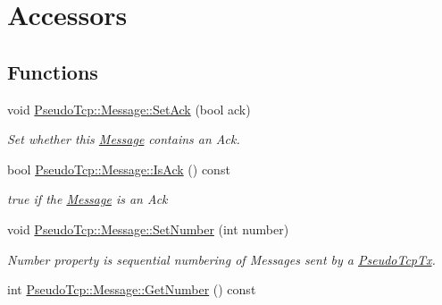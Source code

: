 \hypertarget{group__group1}{
\section{Accessors}
\label{group__group1}
}
\subsection*{Functions}
\begin{DoxyCompactItemize}
\item 
\hypertarget{group__group1_gaefd21c9f3d668b1e918bed1784afab84}{
void \hyperlink{group__group1_gaefd21c9f3d668b1e918bed1784afab84}{PseudoTcp::Message::SetAck} (bool ack)}
\label{group__group1_gaefd21c9f3d668b1e918bed1784afab84}

\begin{DoxyCompactList}\small\item\em Set whether this \hyperlink{classPseudoTcp_1_1Message}{Message} contains an Ack. \item\end{DoxyCompactList}\item 
\hypertarget{group__group1_ga6b3b9a3bccbaa08efa0ebfdbf6222581}{
bool \hyperlink{group__group1_ga6b3b9a3bccbaa08efa0ebfdbf6222581}{PseudoTcp::Message::IsAck} () const }
\label{group__group1_ga6b3b9a3bccbaa08efa0ebfdbf6222581}

\begin{DoxyCompactList}\small\item\em true if the \hyperlink{classPseudoTcp_1_1Message}{Message} is an Ack \item\end{DoxyCompactList}\item 
\hypertarget{group__group1_gafdf542899b221aee3bbce73738d9b809}{
void \hyperlink{group__group1_gafdf542899b221aee3bbce73738d9b809}{PseudoTcp::Message::SetNumber} (int number)}
\label{group__group1_gafdf542899b221aee3bbce73738d9b809}

\begin{DoxyCompactList}\small\item\em Number property is sequential numbering of Messages sent by a \hyperlink{classPseudoTcp_1_1PseudoTcpTx}{PseudoTcpTx}. \item\end{DoxyCompactList}\item 
\hypertarget{group__group1_gada70d38e0b9059de0d8f61fbda4adf30}{
int \hyperlink{group__group1_gada70d38e0b9059de0d8f61fbda4adf30}{PseudoTcp::Message::GetNumber} () const }
\label{group__group1_gada70d38e0b9059de0d8f61fbda4adf30}


\end{DoxyCompactItemize}
